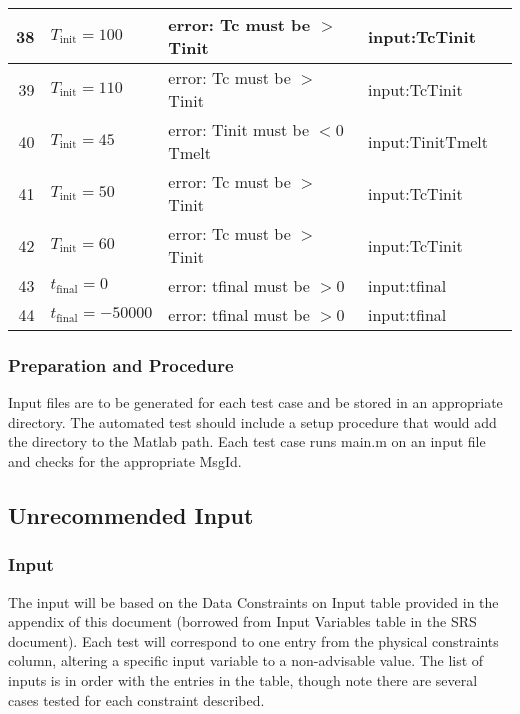 \documentclass[12pt]{article}
\begin{document}
\begin{center}
\begin{longtable}{ | r | p{4cm} | p{4cm} | p{4cm} | p{4cm} |}
	38 & $T_{\text{init}} = 100$ & error: Tc must be $>$ Tinit & input:TcTinit \\ \hline
	39 & $T_{\text{init}} = 110$ & error: Tc must be $>$ Tinit & input:TcTinit \\ \hline
	40 & $T_{\text{init}} = 45$ &error: Tinit must be $< 0$ Tmelt & input:TinitTmelt \\ \hline
	41 & $T_{\text{init}} = 50$ &error: Tc must be $>$ Tinit & input:TcTinit \\ \hline
	42 & $T_{\text{init}} = 60$ &error: Tc must be $>$ Tinit & input:TcTinit \\ \hline
	43 & $t_{\text{final}} = 0$ &error: tfinal must be $> 0$ &input:tfinal \\ \hline
	44 & $t_{\text{final}} = -50000$ &error: tfinal must be $> 0$ &input:tfinal \\ \hline
	\end{longtable}
\end{center}

\subsubsection{Preparation and Procedure}
Input files are to be generated for each test case and be stored in an
appropriate directory. The automated test should include a setup procedure that
would add the directory to the Matlab path. Each test case runs main.m on an
input file and checks for the appropriate MsgId.

\subsection{Unrecommended Input}

\subsubsection{Input}
The input will be based on the Data Constraints on Input table provided in the
appendix of this document (borrowed from Input Variables table in the SRS
document). Each test will correspond to one entry from the physical constraints
column, altering a specific input variable to a non-advisable value. The list of
inputs is in order with the entries in the table, though note there are several
cases tested for each constraint described.
 
\end{document}
